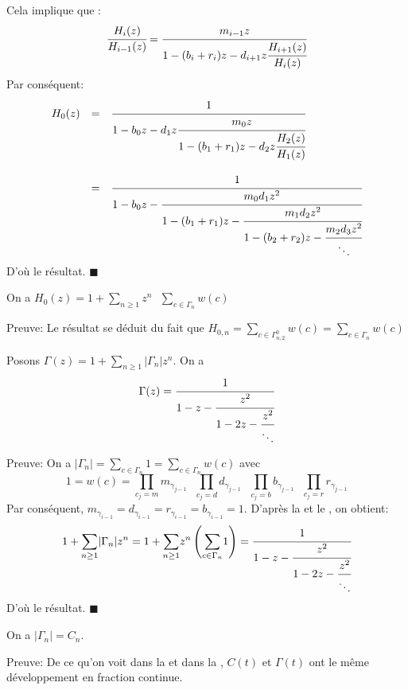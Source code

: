 Cela implique que :\\
\[
	\cfrac{H_{i}(z)}{H_{i-1}(z)}=\cfrac{m_{i-1}z}{1-(b_{i}+r_{i})z-d_{i+1}z\cfrac{H_{i+1}(z)}{H_{i}(z)}}
\]
Par conséquent:
\[
	\begin{array}{r c l}
		H_{0}(z) & =       & \cfrac{1}{1-b_{0}z-d_{1}z\cfrac{m_{0}z}{1-(b_{1}+r_{1})z-d_{2}z\cfrac{H_{2}(z)}{H_{1}(z)}}}                   \\
		         & \text{} &                                                                                                               \\
		         & =       & \cfrac{1}{1-b_{0}z-\cfrac{m_{0}d_{1}z^2}{1-(b_{1}+r_{1})z-\cfrac{m_{1}d_{2}z^2}{1-(b_{2}+r_{2})z-\cfrac{m_{2}
			d_{3}z^2}{\ddots}}}}
	\end{array}
\]
D'où le résultat. \hspace{5pt}$\blacksquare$

\begin{corollaire} \label{H0(t)}
	On a $H_{0}(z) = 1 + \underset{n\geq 1}{\sum}z^{n}\text{ }\underset{c\in \Gamma_{n}}{\sum} w(c)$
\end{corollaire}
Preuve: Le résultat se déduit du fait que  $H_{0,n} = \underset{c\in \Gamma_{n,2}^{0}}{\sum}w(c) = \underset{c\in \Gamma_{n}}{\sum}w(c)$

\begin{proposition}\label{gamma-frac} Posons $\Gamma(z) = 1+\underset{n \geq 1}{\sum}|\Gamma_{n}|z^n $.
	On a \[\Gamma(z) = \cfrac{1}{1-z-\cfrac{z^2}{1-2z-\cfrac{z^2}{\ddots}}}\]
\end{proposition}
Preuve:
On a $|\Gamma_{n}| = \underset{c\in \Gamma_{n}}{\sum}1 = \underset{c\in \Gamma_{n}}{\sum}w(c) $ avec $$1=w(c)=\underset{c_{j}=m}{\prod}
	m_{\gamma_{j-1}}\text{ } \underset{c_{j}=d}{\prod}d_{\gamma_{j-1}}\text{ }\underset{c_{j}=b}{\prod}
	b_{\gamma_{j-1}}\text{ }\underset{c_{j}=r}{\prod}r_{\gamma_{j-1}}$$
Par conséquent,
$m_{\gamma_{i-1}}=d_{\gamma_{i-1}}=r_{\gamma_{i-1}}=b_{\gamma_{i-1}}=1$. D'après la  et le , on obtient:\\
$$
	1+\underset{n \geq 1}{\sum}|\Gamma_{n}|z^n = 1 + \underset{n \geq 1}{\sum}z^n \left(
	\underset{c\in \Gamma_{n}}{\sum}1  \right) = \cfrac{1}{1-z-\cfrac{z^2}{1-2z-
			\cfrac{z^2}{\ddots}}}
$$
D'où le résultat. \hspace{5pt}$\blacksquare$
\begin{corollaire}
	On a $|\Gamma_{n}|=C_{n}$.
\end{corollaire}
Preuve: De ce qu'on voit dans la  et dans la , $C(t)$ et $\Gamma(t)$ ont le même développement en fraction continue.\\

